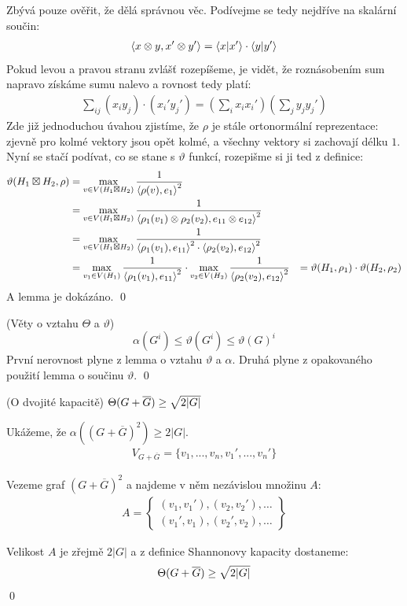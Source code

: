 Zbývá pouze ověřit, že dělá správnou věc. Podívejme se tedy nejdříve na skalární 
součin:
\begin{align}
	{\langle x \otimes y , x' \otimes y'\rangle} = {\langle x | x'\rangle} \cdot {\langle y | y'\rangle}
\end{align}
Pokud levou a pravou stranu zvlášť rozepíšeme, je vidět, že roznásobením sum 
napravo získáme sumu nalevo a rovnost tedy platí:
\begin{align}
	\sum_{ij} (x_iy_j) \cdot (x_i' y_j') = \left( \sum_i x_ix_i'\right) \left(\sum_j 
	y_jy_j' \right)
\end{align}
Zde již jednoduchou úvahou zjistíme, že $\rho$ je stále ortonormální 
reprezentace: zjevně pro kolmé vektory jsou opět kolmé, a všechny vektory si 
zachovají délku $1$. Nyní se stačí podívat, co se stane s $\vartheta$ funkcí, 
rozepišme si ji ted z definice:
\begin{align*}
	\vartheta(H_1 \boxtimes H_2, \rho) &= \max_{v\in V(H_1 \boxtimes H_2)} { 1 
	\over {\langle \rho(v) , e_1\rangle}^2} \\
	&= \max_{v\in V(H_1 \boxtimes H_2)} { 1 \over {\langle \rho_1(v_1)\otimes \rho_2(v_2) , e_{11} \otimes e_{12}\rangle}^2} \\
	&= \max_{v\in V(H_1 \boxtimes H_2)} { 1 \over {\langle \rho_1(v_1) , e_{11}\rangle}^2
		\cdot {\langle \rho_2(v_2) , e_{12}\rangle}^2} \\
	&= \max_{v_1\in V(H_1)} { 1 \over {\langle \rho_1(v_1) , e_{11}\rangle}^2} \cdot
	  \max_{v_2\in V(H_2)} { 1 \over {\langle \rho_2(v_2) , e_{12}\rangle}^2} 
	&= \vartheta(H_1,\rho_1) \cdot \vartheta(H_2, \rho_2)
\end{align*}
A lemma je dokázáno. \qed


\dk (Věty o vztahu $\Theta$ a $\vartheta$)  $$\alpha(G^i) \le \vartheta(G^i) \le \vartheta(G)^i$$
První nerovnost plyne z lemma o vztahu $\vartheta$ a $\alpha$. Druhá plyne z
opakovaného použití lemma o součinu $\vartheta$.
\qed


\lm (O dvojité kapacitě) $\Theta(G + \overline{G}) \ge \sqrt{2|G|}$

\dk Ukážeme, že $\alpha ((G+\overline G)^2) \geq 2|G|$.
\begin{align*}
	V_{G+\overline G} = \{ v_1, ..., v_n, v_1', ..., v_n'\}
\end{align*}

Vezeme graf $(G+\overline G)^2$ a najdeme v něm nezávislou množinu $A$:
\begin{align*}
	A = \left\{\begin{matrix}
		(v_1, v_1'), (v_2, v_2'), \dots \\
		(v_1', v_1), (v_2', v_2), \dots
		\end{matrix}\right\}
\end{align*}

Velikost $A$ je zřejmě $2|G|$ a z definice Shannonovy kapacity dostaneme:
$$\Theta(G + \overline{G}) \ge \sqrt{2|G|}$$
\qed


